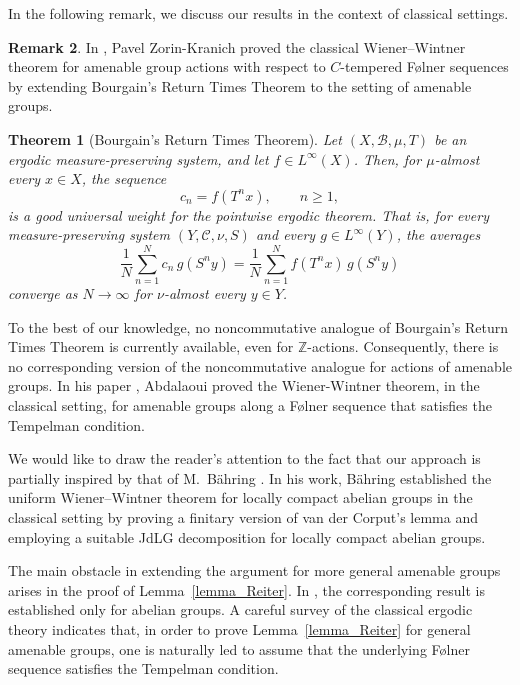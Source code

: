 \documentclass[11pt]{amsart}
\newtheorem{thm}{Theorem}[section]
\theoremstyle{definition}
\theoremstyle{myremark}
\newtheorem{rem}[thm]{Remark}
\numberwithin{equation}{section}
\begin{document}
In the following remark, we discuss our results in the context of classical settings. 
\begin{rem}\label{class-comp}
In \cite{Pavel}, Pavel Zorin-Kranich proved the classical Wiener--Wintner theorem for amenable group actions with respect to \(C\)-tempered F\o lner sequences by extending Bourgain's Return Times Theorem to the setting of amenable groups.
\begin{thm}[Bourgain's Return Times Theorem]
Let $(X,\mathcal{B},\mu,T)$ be an ergodic measure-preserving system, and let
$f\in L^\infty(X)$. Then, for $\mu$-almost every $x\in X$, the sequence
\[
c_n=f(T^n x), \qquad n\geq 1,
\]
is a \emph{good universal weight} for the pointwise ergodic theorem. That is, for every measure-preserving system
$(Y,\mathcal{C},\nu,S)$ and every $g\in L^\infty(Y)$, the averages
\[
\frac{1}{N}\sum_{n=1}^{N} c_n\,g(S^n y)
=
\frac{1}{N}\sum_{n=1}^{N} f(T^n x)\,g(S^n y)
\]
converge as $N\to\infty$ for $\nu$-almost every $y\in Y$.
\end{thm}
To the best of our knowledge, no noncommutative analogue of Bourgain's Return Times Theorem is currently available, even for $\mathbb{Z}$-actions. Consequently, there is no corresponding version of the noncommutative analogue for actions of amenable groups. In his paper \cite{ElAbdalaoui2021}, Abdalaoui proved the Wiener-Wintner theorem, in the classical setting, for amenable groups along a F\o lner sequence that satisfies the Tempelman condition.













 

\medskip
\noindent
We would like to draw the reader's attention to the fact that our approach is partially inspired by that of M.~B\"ahring \cite{Bahring2019}. In his work, B\"ahring established the uniform Wiener--Wintner theorem for locally compact abelian groups in the classical setting by proving a finitary version of van der Corput's lemma and employing a suitable JdLG decomposition for locally compact abelian groups.


The main obstacle in extending the argument for more general amenable groups arises in the proof of Lemma~\ref{lemma_Reiter}.  In \cite{Bahring2019}, the corresponding result is established only for abelian groups. A careful survey of the classical ergodic theory indicates that, in order to prove Lemma~\ref{lemma_Reiter} for general amenable groups, one is naturally led to assume that the underlying F\o lner sequence satisfies the Tempelman condition.














\end{rem}
\end{document}
